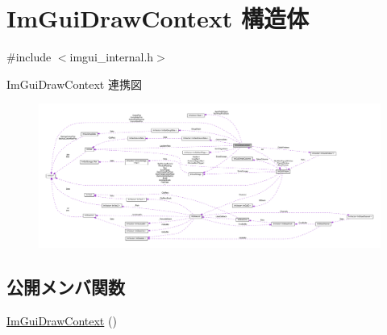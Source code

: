 \hypertarget{struct_im_gui_draw_context}{}\section{Im\+Gui\+Draw\+Context 構造体}
\label{struct_im_gui_draw_context}


{\ttfamily \#include $<$imgui\+\_\+internal.\+h$>$}



Im\+Gui\+Draw\+Context 連携図\nopagebreak
\begin{figure}[H]
\begin{center}
\leavevmode
\includegraphics[width=350pt]{struct_im_gui_draw_context__coll__graph}
\end{center}
\end{figure}
\subsection*{公開メンバ関数}
\begin{DoxyCompactItemize}
\item 
\mbox{\hyperlink{struct_im_gui_draw_context_a0bd8a456860aee49497c58c82a01600c}{Im\+Gui\+Draw\+Context}} ()
\end{DoxyCompactItemize}
